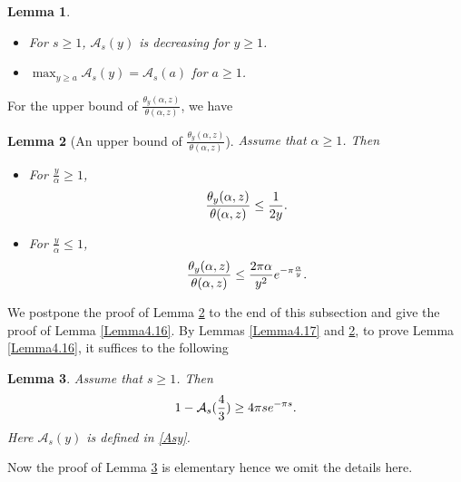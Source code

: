 \documentclass[reqno,english]{amsart}
\newtheorem{lemma}{Lemma}[section]
\newtheorem{open problem}{Open Problem}[section]
\newtheorem{open question}{Open Question}[section]
\newtheorem{open questions on hexagonal lattice}{Open Questions on hexagonal lattice}[section]
\begin{document}
\begin{lemma}

\begin{itemize}
  \item For $s\geq1$, $\mathcal{A}_s(y)$ is decreasing for $y\geq1$.

  \item $\max_{y\geq a} \mathcal{A}_s(y)=\mathcal{A}_s(a)$ for $a\geq1$.
\end{itemize}


\end{lemma}

For the upper bound of $\frac{\theta_y(\alpha,z)}{\theta(\alpha,z)}$, we have

\begin{lemma}[An upper bound of $\frac{\theta_y(\alpha,z)}{\theta(\alpha,z)}$]\label{Lemma4.19} Assume that $\alpha\geq 1$. Then


\begin{itemize}
  \item [(1)] For $\frac{y}{\alpha}\geq1$,
  \begin{equation}\aligned\nonumber
\frac{\theta_y(\alpha,z)}{\theta(\alpha,z)}\leq \frac{1}{2y}.
 \endaligned\end{equation}

  \item [(2)] For $\frac{y}{\alpha}\leq1$,
  \begin{equation}\aligned\nonumber
\frac{\theta_y(\alpha,z)}{\theta(\alpha,z)}\leq \frac{2\pi\alpha}{y^2}e^{-\pi\frac{\alpha}{y}}.
 \endaligned\end{equation}

\end{itemize}




\end{lemma}

We postpone the proof of Lemma \ref{Lemma4.19} to the end of this subsection and give the proof of Lemma \ref{Lemma4.16}.
By Lemmas \ref{Lemma4.17} and \ref{Lemma4.19}, to prove Lemma \ref{Lemma4.16}, it suffices to the following
\begin{lemma}\label{Lemma4.20}
Assume that $s\geq1$. Then
\begin{equation}\aligned\nonumber
1-
\mathcal{A}_s(\frac{4}{3})\geq4\pi se^{-\pi s}
.
 \endaligned\end{equation}
 Here $\mathcal{A}_s(y)$ is defined in \eqref{Asy}.
\end{lemma}
Now the proof of Lemma \ref{Lemma4.20} is elementary hence we omit the details here.
\end{document}
